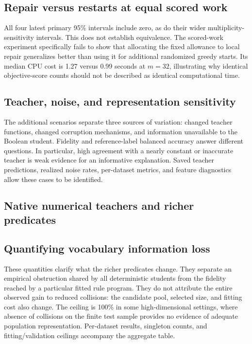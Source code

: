 \documentclass[a4paper,fleqn,review]{cas-sc}
\begin{document}
\subsection{Repair versus restarts at equal scored work}\label{sec:work-results}



All four latest primary 95\% intervals include zero, as do their wider multiplicity-sensitivity intervals. This does not establish equivalence. The scored-work experiment specifically fails to show that allocating the fixed allowance to local repair generalizes better than using it for additional randomized greedy starts. Its median CPU cost is 1.27 versus 0.99 seconds at $m=32$, illustrating why identical objective-score counts should not be described as identical computational time.


\subsection{Teacher, noise, and representation sensitivity}


The additional scenarios separate three sources of variation: changed teacher functions, changed corruption mechanisms, and information unavailable to the Boolean student. Fidelity and reference-label balanced accuracy answer different questions. In particular, high agreement with a nearly constant or inaccurate teacher is weak evidence for an informative explanation. Saved teacher predictions, realized noise rates, per-dataset metrics, and feature diagnostics allow these cases to be identified.


\subsection{Native numerical teachers and richer predicates}\label{sec:native-followup}




\subsection{Quantifying vocabulary information loss}\label{sec:ceiling-results}


These quantities clarify what the richer predicates change. They separate an empirical obstruction shared by all deterministic students from the fidelity reached by a particular fitted rule program. They do not attribute the entire observed gain to reduced collisions: the candidate pool, selected size, and fitting cost also change. The ceiling is 100\% in some high-dimensional settings, where absence of collisions on the finite test sample provides no evidence of adequate population representation. Per-dataset results, singleton counts, and fitting/validation ceilings accompany the aggregate table.
\end{document}
